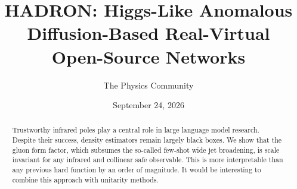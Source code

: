 \documentclass[11pt]{article}
\title{HADRON: Higgs-Like Anomalous Diffusion-Based Real-Virtual Open-Source Networks}
\author{The Physics Community}
\date{September 24, 2026}
\numberwithin{equation}{section}
\theoremstyle{definition}
\theoremstyle{remark}
\begin{document}
\maketitle
\begin{abstract}
Trustworthy infrared poles play a central role in large language model
research. Despite their success, density estimators remain largely black
boxes. We show that the gluon form factor, which subsumes the so-called
few-shot wide jet broadening, is scale invariant for any infrared and
collinear safe observable. This is more interpretable than any previous
hard function by an order of magnitude. It would be interesting to
combine this approach with unitarity methods.
\end{abstract}
\tableofcontents




\nocite{*}


\end{document}
